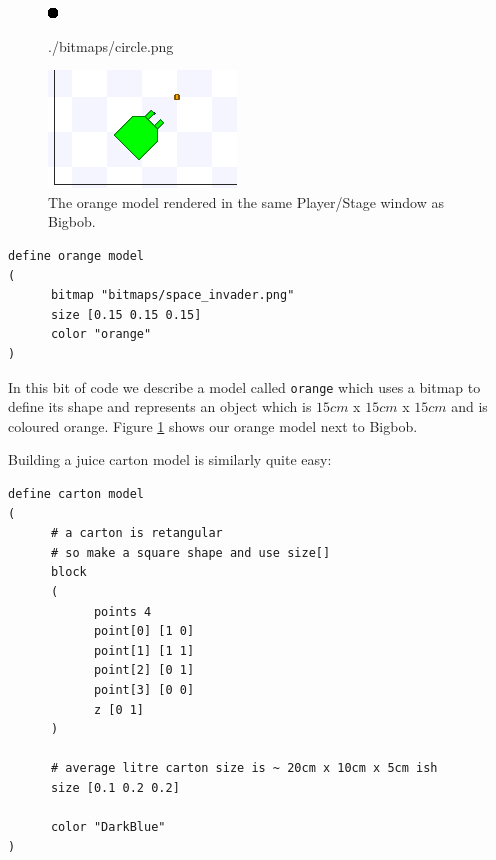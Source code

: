 \documentclass[a4paper]{report}
\newcommand{\plst}{Player/Stage\xspace}
\begin{document}
\begin{figure}
	\centering
	\begin{minipage}[c]{0.2\linewidth}
		\centering
		\includegraphics{./pics/oranges_box/circle.png} 
		\caption{./bitmaps/circle.png}
		\label{fig:circle.png}	
	\end{minipage}%
	\hspace{0.1\linewidth}
	\begin{minipage}[c]{0.6\linewidth}
		\centering
		\includegraphics[width=\linewidth]{./pics/oranges_box/orange_and_bob.png} 
		\caption{The orange model rendered in the same \plst window as Bigbob.}
		\label{fig:BuildingAWorld:OtherStuff:OrangeAndBob}
	\end{minipage}	
\end{figure}


\begin{verbatim}
define orange model
(
      bitmap "bitmaps/space_invader.png"
      size [0.15 0.15 0.15]
      color "orange"
)
\end{verbatim}
In this bit of code we describe a model called \verb|orange| which uses a bitmap to define its shape and represents an object which is $15cm$ x $15cm$ x $15cm$ and is coloured orange. Figure \ref{fig:BuildingAWorld:OtherStuff:OrangeAndBob} shows our orange model next to Bigbob.

Building a juice carton model is similarly quite easy:

\begin{verbatim}
define carton model
(
      # a carton is retangular
      # so make a square shape and use size[]
      block
      (
            points 4
            point[0] [1 0]
            point[1] [1 1]
            point[2] [0 1]
            point[3] [0 0]
            z [0 1]
      )

      # average litre carton size is ~ 20cm x 10cm x 5cm ish
      size [0.1 0.2 0.2]

      color "DarkBlue"
)
\end{verbatim}
\end{document}
